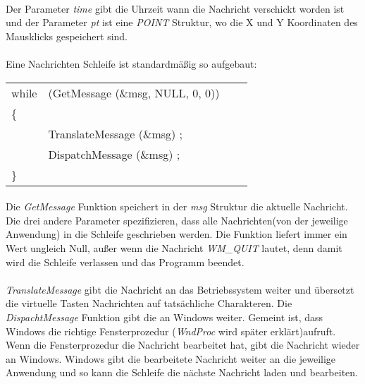 \paragraph{}
Der Parameter \textit{time} gibt die Uhrzeit wann die Nachricht verschickt worden ist und der Parameter \textit{pt} ist eine \textit{POINT} Struktur, wo die X und Y Koordinaten des Mausklicks gespeichert sind.

\paragraph{}
Eine Nachrichten Schleife ist standardmäßig so aufgebaut:

\begin{tabular}{llll}
while & (GetMessage (\&msg, NULL, 0, 0))\\
\{\\
     & TranslateMessage (\&msg) ;\\
     & DispatchMessage (\&msg) ;\\
\}\\
\end{tabular}

\paragraph{}
Die \textit{GetMessage} Funktion speichert in der \textit{msg} Struktur die aktuelle Nachricht. Die drei andere Parameter spezifizieren, dass alle Nachrichten(von der jeweilige Anwendung) in die Schleife geschrieben werden. Die Funktion liefert immer ein Wert ungleich Null, außer wenn die Nachricht \textit{WM\_QUIT} lautet, denn damit wird die Schleife verlassen und das Programm beendet.

\paragraph{}
\textit{TranslateMessage} gibt die Nachricht an das Betriebssystem weiter und übersetzt die virtuelle Tasten Nachrichten auf tatsächliche Charakteren. Die \textit{DispachtMessage} Funktion gibt die an Windows weiter. Gemeint ist, dass Windows die richtige Fensterprozedur (\textit{WndProc} wird später erklärt)aufruft. Wenn die Fensterprozedur die Nachricht bearbeitet hat, gibt die Nachricht wieder an Windows. Windows gibt die bearbeitete Nachricht weiter an die jeweilige Anwendung und so kann die Schleife die nächste Nachricht laden und bearbeiten.



